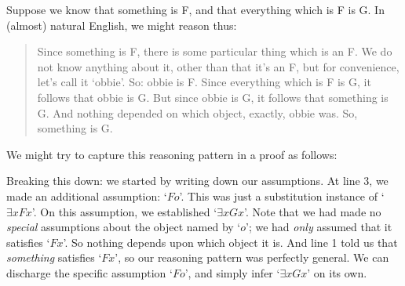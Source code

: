 Suppose we know that something is F, and that everything which is F is G. In (almost) natural English, we might reason thus:
	\begin{quote}
		Since something is F, there is some particular thing which is an F. We do not know anything about it, other than that it's an F, but for convenience, let's call it `obbie'. So: obbie is F. Since everything which is F is G, it follows that obbie is G. But since obbie is G, it follows that something is G. And nothing depended on which object, exactly, obbie was. So, something is G.
	\end{quote}
We might try to capture this reasoning pattern in a proof as follows:
\begin{pf}
	\open
		 
	\close
\end{pf}\noindent
Breaking this down: we started by writing down our assumptions. At line 3, we made an additional assumption: `$Fo$'. This was just a substitution instance of `$\exists x Fx$'. On this assumption, we established `$\exists x Gx$'. Note that we had made no \emph{special} assumptions about the object named by `$o$'; we had \emph{only} assumed that it satisfies `$Fx$'. So nothing depends upon which object it is. And line 1 told us that \emph{something} satisfies `$Fx$', so our reasoning pattern was perfectly general. We can discharge the specific assumption `$Fo$', and simply infer `$\exists x Gx$' on its own.

